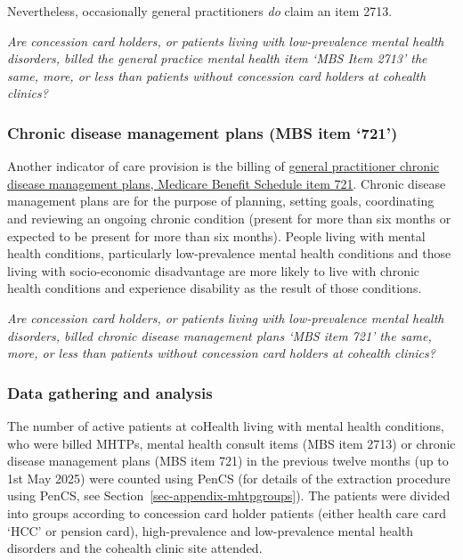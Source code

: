\documentclass[
  letterpaper,
  DIV=11,
  numbers=noendperiod,
  oneside]{scrartcl}
\begin{document}
Nevertheless, occasionally general practitioners \emph{do} claim an item
2713.

\emph{Are concession card holders, or patients living with
low-prevalence mental health disorders, billed the general practice
mental health item `MBS Item 2713' the same, more, or less than patients
without concession card holders at cohealth clinics?}

\subsubsection{Chronic disease management plans (MBS item
`721')}\label{chronic-disease-management-plans-mbs-item-721}

Another indicator of care provision is the billing of
\href{https://www9.health.gov.au/mbs/fullDisplay.cfm?type=item&q=721}{general
practitioner chronic disease management plans, Medicare Benefit Schedule
item 721}. Chronic disease management plans are for the purpose of
planning, setting goals, coordinating and reviewing an ongoing chronic
condition (present for more than six months or expected to be present
for more than six months). People living with mental health conditions,
particularly low-prevalence mental health conditions and those living
with socio-economic disadvantage are more likely to live with chronic
health conditions and experience disability as the result of those
conditions.

\emph{Are concession card holders, or patients living with
low-prevalence mental health disorders, billed chronic disease
management plans `MBS item 721' the same, more, or less than patients
without concession card holders at cohealth clinics?}

\subsubsection{Data gathering and
analysis}\label{data-gathering-and-analysis}

The number of active patients at coHealth living with mental health
conditions, who were billed MHTPs, mental health consult items (MBS item
2713) or chronic disease management plans (MBS item 721) in the previous
twelve months (up to 1st May 2025) were counted using PenCS (for details
of the extraction procedure using PenCS, see
Section~\ref{sec-appendix-mhtpgroups}). The patients were divided into
groups according to concession card holder patients (either health care
card `HCC' or pension card), high-prevalence and low-prevalence mental
health disorders and the cohealth clinic site attended.
\end{document}
